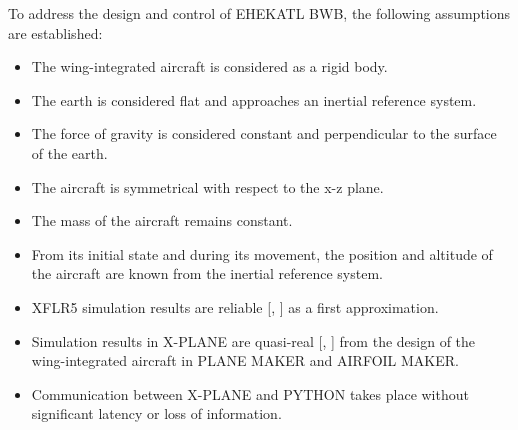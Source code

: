 To address the design and control of EHEKATL BWB, the following assumptions are established:
\begin{itemize}
    \item The wing-integrated aircraft is considered as a rigid body.
    \item The earth is considered flat and approaches an inertial reference system.
    \item The force of gravity is considered constant and perpendicular to the surface of the earth. 
    \item The aircraft is symmetrical with respect to the x-z plane.
    \item The mass of the aircraft remains constant. 
    \item From its initial state and during its movement, the position and altitude of the aircraft are known from the inertial reference system.
    \item XFLR5 simulation results are reliable [\cite{Durmus2019}, \cite{Rajesh2020}] as a first approximation. 
    \item Simulation results in X-PLANE are quasi-real [\cite{Litt2022}, \cite{Thang2016}] from the design of the wing-integrated aircraft in PLANE MAKER and AIRFOIL MAKER.
    \item Communication between X-PLANE and PYTHON takes place without significant latency or loss of information.
\end{itemize}



